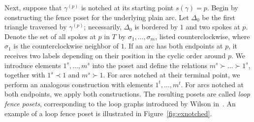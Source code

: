 \documentclass{article}
\theoremstyle{remark}
\begin{document}
Next, suppose that \( \gamma^{(p)} \) is notched at its starting point \( s(\gamma) = p \). Begin by constructing the fence poset for the underlying plain arc. Let \( \Delta_0 \) be the first triangle traversed by \( \gamma^{(p)} \); necessarily, \( \Delta_0 \) is bordered by \( 1 \) and two spokes at \( p \). Denote the set of all spokes at \( p \) in \( T \) by \( \sigma_1, \ldots, \sigma_m \), listed counterclockwise, where \( \sigma_1 \) is the counterclockwise neighbor of \( 1 \). If an arc has both endpoints at \( p \), it receives two labels depending on their position in the cyclic order around \( p \). We introduce elements \( 1^s, \ldots, m^s \) into the poset and define the relations \( m^s \succ \dots \succ 1^s \), together with \( 1^s \prec 1 \) and \( m^s \succ 1 \). For arcs notched at their terminal point, we perform an analogous construction with elements \( 1^t, \ldots, m^t \). For arcs notched at both endpoints, we apply both constructions. The resulting posets are called \emph{loop fence posets}, corresponding to the loop graphs introduced by Wilson in~\cite{wilson2020surface}. An example of a loop fence poset is illustrated in Figure~\ref{fig:exnotched}.
\end{document}
